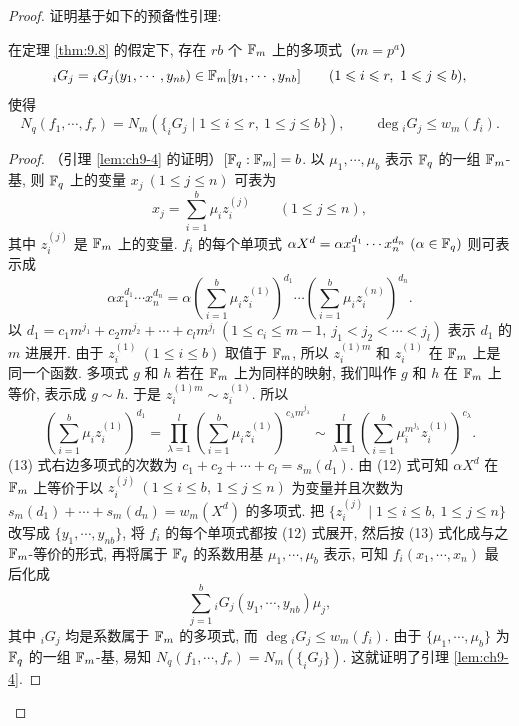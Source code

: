 \begin{proof}
证明基于如下的预备性引理:

\begin{lemma}\label{lem:ch9-4}
在定理 \ref{thm:9.8} 的假定下, 存在 $rb$ 个 $\mathbb{F}_m$ 上的多项式（$m=p^a$）
\[
  _iG_j={}_iG_j(y_1,\cdots,y_{nb})\in\mathbb{F}_m[y_1,\cdots,y_{nb}]
  \qquad(1\leqslant i\leqslant r,\ 1\leqslant j\leqslant b),
\]
使得
\[
  N_q(f_1,\cdots,f_r)=N_m(\{_iG_j\mid 1\leqslant i\leqslant r,\ 1\leqslant j\leqslant b\}),
  \qquad\deg{}_iG_j\leqslant w_m(f_i).
\]
\end{lemma}

\begin{proof}
（引理 \ref{lem:ch9-4} 的证明）$[\mathbb{F}_q:\mathbb{F}_m]=b$. 以 $\mu_1,\cdots,\mu_b$ 表示 $\mathbb{F}_q$ 的一组 $\mathbb{F}_m$-基, 则 $\mathbb{F}_q$ 上的变量 $x_j\ (1\leqslant j\leqslant n)$ 可表为
\[
  x_j=\sum_{i=1}^{b}\mu_iz_i^{(j)}\qquad(1\leqslant j\leqslant n),
\]
其中 $z_i^{(j)}$ 是 $\mathbb{F}_m$ 上的变量. $f_i$ 的每个单项式 $\alpha X^d=\alpha x_1^{d_1}\cdots x_n^{d_n}\ (\alpha\in\mathbb{F}_q)$ 则可表示成
\begin{equation}\tag{12}
  \alpha x_1^{d_1}\cdots x_n^{d_n}
  =\alpha\left(\sum_{i=1}^{b}\mu_iz_i^{(1)}\right)^{d_1}\cdots
  \left(\sum_{i=1}^{b}\mu_iz_i^{(n)}\right)^{d_n}.
\end{equation}
以 $d_1=c_1m^{j_1}+c_2m^{j_2}+\cdots+c_lm^{j_l}\ (1\leqslant c_i\leqslant m-1,\ j_1<j_2<\cdots<j_l)$ 表示 $d_1$ 的 $m$ 进展开. 由于 $z_i^{(1)}\ (1\leqslant i\leqslant b)$ 取值于 $\mathbb{F}_m$, 所以 $z_i^{(1)m}$ 和 $z_i^{(1)}$ 在 $\mathbb{F}_m$ 上是同一个函数. 多项式 $g$ 和 $h$ 若在 $\mathbb{F}_m$ 上为同样的映射, 我们叫作 $g$ 和 $h$ 在 $\mathbb{F}_m$ 上等价, 表示成 $g\sim h$. 于是 $z_i^{(1)m}\sim z_i^{(1)}$. 所以
\begin{equation}\tag{13}
  \left(\sum_{i=1}^{b}\mu_iz_i^{(1)}\right)^{d_1}
  =\prod_{\lambda=1}^{l}\left(\sum_{i=1}^{b}\mu_iz_i^{(1)}\right)^{c_{\lambda}m^{j_{\lambda}}}
  \sim\prod_{\lambda=1}^{l}\left(\sum_{i=1}^{b}\mu_i^{m^{j_{\lambda}}}z_i^{(1)}\right)^{c_{\lambda}}.
\end{equation}
(13) 式右边多项式的次数为 $c_1+c_2+\cdots+c_l=s_m(d_1)$. 由 (12) 式可知 $\alpha X^d$ 在 $\mathbb{F}_m$ 上等价于以 $z_i^{(j)}\ (1\leqslant i\leqslant b,\ 1\leqslant j\leqslant n)$ 为变量并且次数为 $s_m(d_1)+\cdots+s_m(d_n)=w_m(X^d)$ 的多项式. 把 $\{z_i^{(j)}\mid 1\leqslant i\leqslant b,\ 1\leqslant j\leqslant n\}$ 改写成 $\{y_1,\cdots,y_{nb}\}$, 将 $f_i$ 的每个单项式都按 (12) 式展开, 然后按 (13) 式化成与之 $\mathbb{F}_m$-等价的形式, 再将属于 $\mathbb{F}_q$ 的系数用基 $\mu_1,\cdots,\mu_b$ 表示, 可知 $f_i(x_1,\cdots,x_n)$ 最后化成
\[
  \sum_{j=1}^{b}{}_iG_j(y_1,\cdots,y_{nb})\mu_j,
\]
其中 ${}_iG_j$ 均是系数属于 $\mathbb{F}_m$ 的多项式, 而 $\deg{}_iG_j\leqslant w_m(f_i)$. 由于 $\{\mu_1,\cdots,\mu_b\}$ 为 $\mathbb{F}_q$ 的一组 $\mathbb{F}_m$-基, 易知 $N_q(f_1,\cdots,f_r)=N_m(\{_iG_j\})$. 这就证明了引理 \ref{lem:ch9-4}.
\end{proof}


\end{proof}
